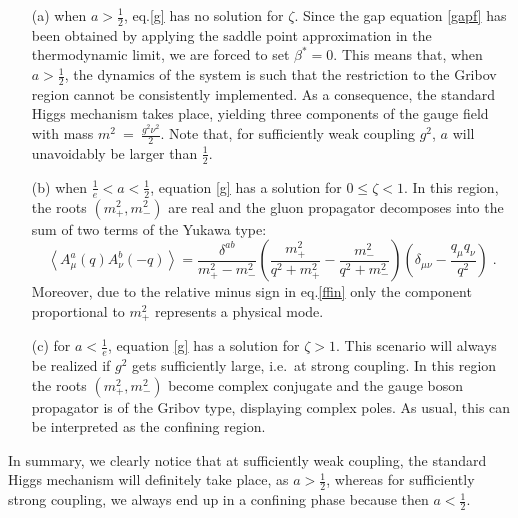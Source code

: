 \begin{itemize}
\item[(a)]  when $a>\frac{1}{2}$,  eq.\eqref{g}  has no solution for $\zeta$. Since the gap equation \eqref{gapf} has been  obtained by applying the saddle point approximation in the thermodynamic limit, we are forced to set $\beta^{\ast}=0$.  This means that, when $a>\frac{1}{2}$, the dynamics of the system is such that the restriction to the Gribov region cannot be consistently implemented.  As a consequence, the standard Higgs mechanism takes place, yielding three components of the gauge field with mass $m^{2} ~=~ \frac{g^{2}\nu^{2}}{2}$. Note that, for sufficiently weak coupling $g^2$, $a$ will unavoidably be larger than $\frac{1}{2}$.


\item[(b)] when $\frac{1}{e}<a<\frac{1}{2}$, equation  \eqref{g} has a solution for  $0 \le \zeta <1$. In this region, the roots $(m^2_+, m^2_-)$  are real and the gluon propagator decomposes into the sum of two terms of the Yukawa type:
\begin{equation}
\left\langle A_{\mu }^{a }(q)A_{\nu }^{b }(-q)\right\rangle
=\frac{\delta^{ab}}{m^2_+-m^2_-}  \left(   \frac{m^2_+}{q^2+m^2_+} -   \frac{m^2_-}{q^2+m^2_-}   \right) 
 \left( \delta _{\mu
\nu }-\frac{q_{\mu }q_{\nu }}{q^{2}}\right)  \label{ffin} \;.
\end{equation}
Moreover, due to the relative minus sign in eq.\eqref{ffin} only the component proportional to
$m^{2}_{+}$ represents a physical mode.
\item[(c)]  for $a<\frac{1}{e}$, equation \eqref{g} has a solution for  $\zeta>1$. This
scenario will always be realized if $g^2$ gets sufficiently large, i.e.~at strong coupling. In
this region the roots  $(m^2_+, m^2_-)$  become complex conjugate and the gauge boson
propagator is of the Gribov type, displaying complex poles.  As usual, this can be interpreted
as the confining region.
\end{itemize}
In summary, we clearly notice that at sufficiently weak coupling, the standard Higgs mechanism will definitely take place, as $a>\frac{1}{2}$, whereas for sufficiently strong coupling, we always end up in a confining phase because then $a<\frac{1}{2}$.

